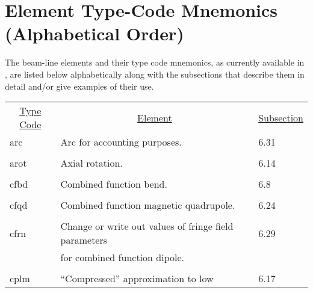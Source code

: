 \newpage
\section{Element Type-Code Mnemonics \protect\newline (Alphabetical Order)}
     The beam-line elements and their type code mnemonics, as currently
available in , are listed below alphabetically along with the
subsections that describe them in detail and/or give examples of their
use.
\begin{center}
\begin{tabular}{lll}
\multicolumn{1}{c}{\underline{Type Code}} &
\multicolumn{1}{c}{\underline{Element}}   &
\multicolumn{1}{c}{\underline{Subsection}} \\
\hspace{1.5em}arc  &  Arc for accounting purposes.  &   \hspace{2em}6.31\\
\vspace{-3mm}& &\\
\hspace{1.5em}arot    &         Axial rotation.                      &  \hspace{2em}6.14\\
\vspace{-3mm}& &\\
\hspace{1.5em}cfbd    &         Combined function bend.         &  \hspace{2em}6.8 \\
\vspace{-3mm}& &\\
\hspace{1.5em}cfqd    &       Combined function magnetic quadrupole. &  \hspace{2em}6.24\\
\vspace{-3mm}& &\\
\hspace{1.5em}cfrn    &   Change or write out values of fringe field parameters &  \hspace{2em}6.29\\
               &          for combined function dipole.                    &      \\
\vspace{-3mm}& &\\
\hspace{1.5em}cplm    &         ``Compressed'' approximation to low   &\hspace{2em}6.17\\

\end{tabular}
\end{center}

